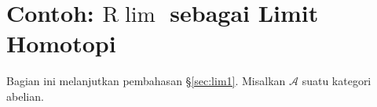 
\section{Contoh: \texorpdfstring{$\mathrm{R}\lim$}{Rlim} sebagai Limit Homotopi}\label{sec:Rlim}
\hypertarget{o014.aljabr2.chapter4.rlim-homotopy-limit}{ }

Bagian ini melanjutkan pembahasan \S\ref{sec:lim1}. Misalkan $\mathcal{A}$
suatu kategori abelian.

